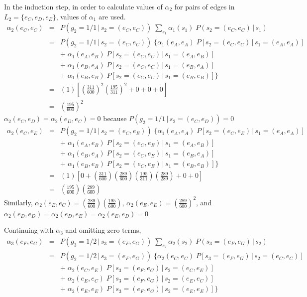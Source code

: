\documentclass[a4paper,11pt,twoside,abstraction,titlepage]{article}
\begin{document}
\noindent In the induction step, in order to calculate values of $\alpha_2$ for pairs of edges in $L_2 = \{e_{C}, e_{D}, e_{E}\}$, values of $\alpha_1$ are used.
\vspace{-10pt}
\begin{eqnarray*}
\alpha_2(e_C,e_C) &=& P(g_2=1/1\,|\,s_2=(e_C,e_C)) \; \sum\limits_{s_1} \alpha_1(s_1) \; P(s_2=(e_C,e_C)\,|\,s_1) \\
&=& P(g_2=1/1\,|\,s_2=(e_C,e_C)) \;  \{ \alpha_1(e_A,e_A) \; P[s_2=(e_C,e_C) \,  | \, s_1 = (e_A,e_A)]  \\
&&+ \; \alpha_1(e_A,e_B) \; P[s_2=(e_C,e_C) \,  | \, s_1 = (e_A,e_B)]\\
&&+ \; \alpha_1(e_B,e_A) \; P[s_2=(e_C,e_C) \,  | \, s_1 = (e_B,e_A)]\\
&&+\; \alpha_1(e_B,e_B)\; P[s_2=(e_C,e_C) \,  | \, s_1 = (e_B,e_B)] \} \\
&=& (1)\left[\left( \frac{311}{600} \right)^2 \!\! \left(\frac{195}{311}\right)^2+0+0+0\right] \\
&=& \left( \frac{195}{600} \right)^2
\end{eqnarray*}
\noindent$\alpha_2(e_C,e_D) = \alpha_2(e_D,e_C) = 0$ because $ P(g_2=1/1\,|\,s_2=(e_C,e_D)) = 0$
\begin{eqnarray*}
\alpha_2(e_C,e_E) &=&  P(g_2=1/1\,|\,s_2=(e_C,e_E)) \;  \{ \alpha_1(e_A,e_A) \; P[s_2=(e_C,e_E) \,  | \, s_1 = (e_A,e_A)]\\
&&+ \; \alpha_1(e_A,e_B) \; P[s_2=(e_C,e_E) \,  | \, s_1 = (e_A,e_B)]\\
&&+ \; \alpha_1(e_B,e_A) \; P[s_2=(e_C,e_E) \,  | \, s_1 = (e_B,e_A)]\\
&&+ \; \alpha_1(e_B,e_B)\; P[s_2=(e_C,e_E) \,  | \, s_1 = (e_B,e_B)] \} \\
&=& (1)\left[0+\left( \frac{311}{600} \right) \!\! \left( \frac{289}{600} \right) \!\! \left(\frac{195}{311}\right) \!\! \left(\frac{289}{289}\right)+0+0\right] \\
&=& \left( \frac{195}{600} \right) \!\! \left( \frac{289}{600} \right)
\end{eqnarray*}
\noindent Similarly, $\alpha_2(e_E,e_C) = \left( \frac{289}{600} \right) \!\! \left( \frac{195}{600} \right)$, $\alpha_2(e_E,e_E) = \left( \frac{289}{600} \right)^2 $, and $\alpha_2(e_D,e_D) = \alpha_2(e_D,e_E) = \alpha_2(e_E,e_D)  = 0$


\noindent Continuing with $\alpha_3$ and omitting zero terms,
\begin{eqnarray*}
\alpha_3(e_F,e_G) &=& P(g_3=1/2\,|\,s_3=(e_F,e_G)) \; \sum\limits_{s_2} \alpha_2(s_2) \; P(s_3=(e_F,e_G)\,|\,s_2) \\
&=& P(g_2=1/2\,|\,s_3=(e_F,e_G)) \;  \{ \alpha_2(e_C,e_C) \; P[s_3=(e_F,e_G) \,  | \, s_2 = (e_C,e_C)]  \\
&&+ \; \alpha_2(e_C,e_E) \; P[s_3=(e_F,e_G) \,  | \, s_2 = (e_C,e_E)]\\
&&+ \; \alpha_2(e_E,e_C) \; P[s_3=(e_F,e_G) \,  | \, s_2 = (e_E,e_C)]\\
&&+ \; \alpha_2(e_E,e_E)\; P[s_3=(e_F,e_G) \,  | \, s_2 = (e_E,e_E)] \} \\
\end{eqnarray*}
\end{document}
